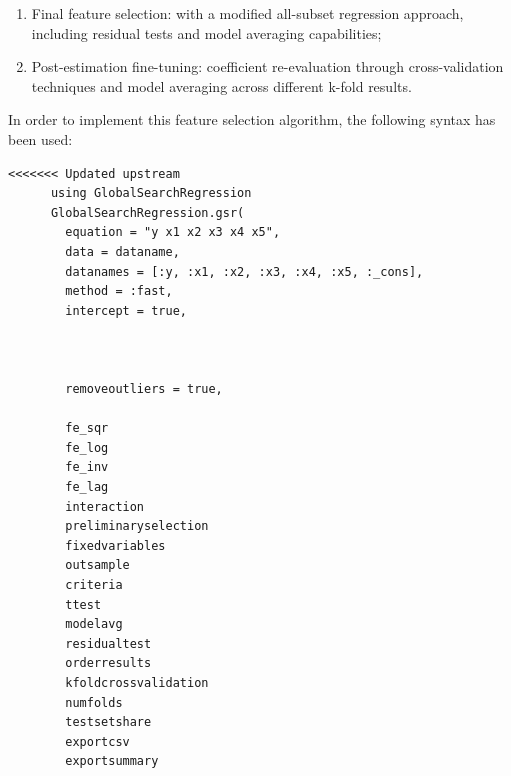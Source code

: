 \documentclass{article}
\begin{document}
\begin{enumerate}
\begin{enumerate}
    \item Final feature selection: with a modified all-subset regression approach, including residual tests and model averaging capabilities; 
    
    \item Post-estimation fine-tuning: coefficient re-evaluation through cross-validation techniques and model averaging across different k-fold results. 
\end{enumerate}

In order to implement this feature selection algorithm, the following syntax has been used:

\begin{lstlisting} 
<<<<<<< Updated upstream
      using GlobalSearchRegression
      GlobalSearchRegression.gsr(
        equation = "y x1 x2 x3 x4 x5",
        data = dataname,
        datanames = [:y, :x1, :x2, :x3, :x4, :x5, :_cons],
        method = :fast,
        intercept = true,
        
        
        
        removeoutliers = true,

        fe_sqr
        fe_log
        fe_inv
        fe_lag
        interaction
        preliminaryselection
        fixedvariables
        outsample
        criteria
        ttest
        modelavg
        residualtest
        orderresults
        kfoldcrossvalidation
        numfolds
        testsetshare
        exportcsv
        exportsummary
\end{lstlisting}


\end{enumerate}
\end{document}
